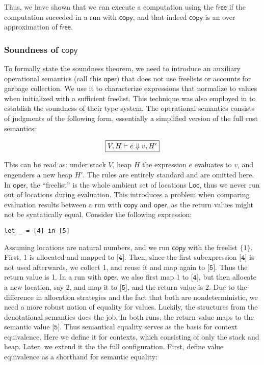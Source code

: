 \documentclass{easychair}
\newcommand{\ms}[1]{\ensuremath{\mathsf{#1}}}
\newcounter{rule}
\theoremstyle{definition}
\begin{document}
Thus, we have shown that we can execute a computation using the 
$\ms{free}$ if the computation suceeded in a run with $\ms{copy}$, and that indeed 
$\ms{copy}$ is an over approximation of $\ms{free}$.

\subsubsection{Soundness of $\ms{copy}$}
\label{sect:soundcopy}

To formally state the soundness theorem,
we need to introduce an auxiliary operational semantics (call this \ms{oper}) 
that does not use freelists or accounts for garbage collection. We use
it to characterize expressions that normalize to values when initialized with a sufficient 
freelist.  This technique was also employed in \cite{Hofmann:2003:SPH:604131.604148} 
to establish the soundness of their type system. The operational semantics consists of 
judgments of the following form, essentially a simplified version of the full cost semantics:

\[
\fbox{$V,H \vdash e \Downarrow v, H'$}
\]

This can be read as: under stack $V$, heap $H$ the expression $e$ evaluates to $v$, 
and engenders a new heap $H'$. The rules are entirely standard and are omitted here.
In $\ms{oper}$, the ``freelist'' is the whole ambient set of locations $\ms{Loc}$, 
thus we never run out of locations during evaluation. This introduces a problem when comparing 
evaluation results between a run with $\ms{copy}$ and $\ms{oper}$, as the return values 
might not be syntatically equal. Consider the following expression:

\begin{verbatim}
let _ = [4] in [5]
\end{verbatim}

Assuming locations are natural numbers, and we run $\ms{copy}$ with the freelist $\{1\}$. 
First, 1 is allocated and mapped to $\texttt{[4]}$. 
Then, since the first subexpression $\texttt{[4]}$ is not used afterwards, we collect 1, and reuse it
and map again to $\texttt{[5]}$. Thus the return value is 1.  In a run with $\ms{oper}$, 
we also first map 1 to $\texttt{[4]}$, but then 
allocate a new location, say 2, and map it to $\texttt{[5]}$, and the return value is 2. Due to the 
difference in allocation strategies and the fact that both are nondeterministic, we need a more 
robust notion of equality for values. Luckily, the structures from the denotational semantics 
does the job. In both runs, the return value maps to the semantic value $\texttt{[5]}$.
Thus semantical equality serves as the basis for context equivalence. 
Here we define it for contexts, which consisting of only the stack and heap. 
Later, we extend it the the full configuration. First, define value equivalence as
a shorthand for semantic equality: 
\end{document}
